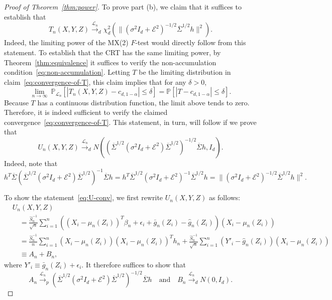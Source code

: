 \documentclass[ejs]{imsart}
\numberwithin{equation}{section}
\theoremstyle{plain}
\theoremstyle{definition}
\theoremstyle{remark}
\newcommand{\eps}{\epsilon}
\newcommand{\srx}{X}
\newcommand{\srz}{Z}
\newcommand{\sry}{Y}
\newcommand{\seps}{\epsilon}
\begin{document}
\begin{proof}[Proof of Theorem~\ref{thm:power}]
To prove part (b), we claim that it suffices to establish that
\begin{equation}
	T_n(\srx, \sry, \srz)\overset{\mathcal L_n}\rightarrow_d \chi^2_d(\|(\sigma^2I_d +\mathcal E^2)^{-1/2}\overline \Sigma^{1/2} h\|^2).
	\label{eq:convergence-of-T}
\end{equation}
Indeed, the limiting power of the MX(2) $F$-test would directly follow from this statement. To establish that the CRT has the same limiting power, by Theorem~\ref{thm:equivalence} it suffices to verify the non-accumulation condition~\eqref{eq:non-accumulation}. Letting $T$ be the limiting distribution in claim~\eqref{eq:convergence-of-T}, this claim implies that for any $\delta > 0$,
\begin{equation*}
 \lim_{n \rightarrow \infty}\ \mathbb P_{\mathcal L_n}[|T_n(\srx, \sry, \srz)-c_{d,1-\alpha}| \leq \delta] = \mathbb P[|T - c_{d,1-\alpha}| \leq \delta].
\end{equation*}
Because $T$ has a continuous distribution function, the limit above tends to zero. Therefore, it is indeed sufficient to verify the claimed convergence~\eqref{eq:convergence-of-T}. This statement, in turn, will follow if we prove that
	\begin{equation}
		U_n(\srx, \sry, \srz) \overset{\mathcal L_n}\rightarrow_d N((\overline \Sigma^{1/2}(\sigma^2I_d +\mathcal E^2)\overline \Sigma^{1/2})^{-1/2}\overline \Sigma h, I_d).
		\label{eq:U-conv}
	\end{equation}
	Indeed, note that
	\begin{equation*}
		h^T \overline \Sigma (\overline \Sigma^{1/2}(\sigma^2I_d +\mathcal E^2)\overline \Sigma^{1/2})^{-1}\overline \Sigma h = h^T \overline \Sigma^{1/2} (\sigma^2I_d +\mathcal E^2)^{-1}\overline \Sigma^{1/2} h = \|(\sigma^2I_d +\mathcal E^2)^{-1/2}\overline \Sigma^{1/2} h\|^2.
	\end{equation*}
	
	To show the statement~\eqref{eq:U-conv}, we first rewrite $U_n(\srx, \sry,\srz)$ as follows:
	\begin{equation*}
		\begin{split}
			&U_n(X,Y,Z) \\
			&\quad= \frac{\widehat S^{-1}_n}{\sqrt{n}}\sum_{i = 1}^n ((X_i - \mu_n(Z_i))^T \beta_n + \eps_i + \bar g_n(\srz_i) - \widehat g_n(\srz_i))(\srx_i - \mu_n(\srz_i)) \\
			&\quad= \frac{\widehat S^{-1}_n}{n}\sum_{i = 1}^n (\srx_i - \mu_n(\srz_i))(X_i - \mu_n(Z_i))^T h_n + \frac{\widehat S^{-1}_n}{\sqrt{n}}\sum_{i = 1}^n (Y'_i - \widehat g_n(Z_i))(\srx_i - \mu_n(\srz_i)) \\
			&\quad \equiv A_n + B_n,
		\end{split}
	\end{equation*}
	where $Y'_i \equiv \bar g_n(\srz_i) + \seps_i.$ It therefore suffices to show that
	\begin{equation}
		A_n \overset{\mathcal L_n}\rightarrow_p (\overline \Sigma^{1/2}(\sigma^2 I_d + \mathcal E^2)\overline \Sigma^{1/2})^{-1/2}\overline \Sigma h\quad \text{and} \quad B_n \overset{\mathcal L_n}\rightarrow_d N(0, I_d).
		\label{eq:sufficient}
	\end{equation}
	

\end{proof}
\end{document}
